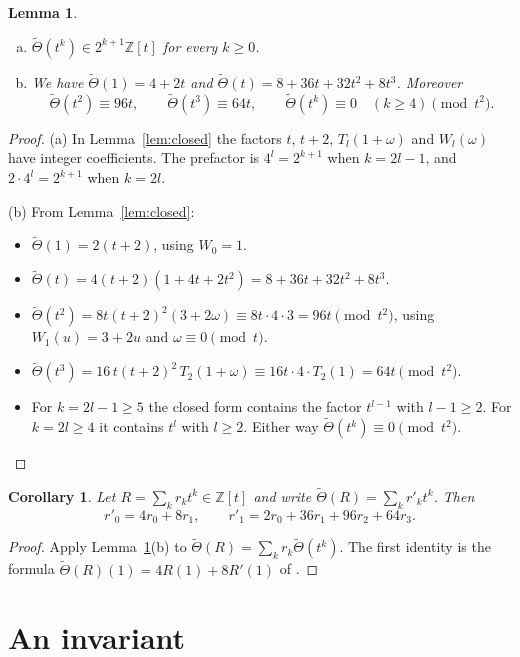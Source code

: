 \documentclass[11pt]{amsart}
\newtheorem{lemma}[theorem]{Lemma}
\newtheorem{corollary}[theorem]{Corollary}
\theoremstyle{definition}
\theoremstyle{remark}
\newcommand{\Z}{\mathbb{Z}}
\newcommand{\Th}{\widetilde{\Theta}}
\begin{document}
\begin{lemma}\label{lem:ab}
\begin{enumerate}[(a)]
\item $\Th(t^k)\in 2^{k+1}\Z[t]$ for every $k\ge0$.
\item We have $\Th(1)=4+2t$ and $\Th(t)=8+36t+32t^2+8t^3$. Moreover
\[
  \Th(t^2)\equiv 96t,\qquad \Th(t^3)\equiv 64t,\qquad \Th(t^k)\equiv0\quad(k\ge4)\pmod{t^2}.
\]
\end{enumerate}
\end{lemma}
\begin{proof}
(a) In Lemma~\ref{lem:closed} the factors $t$, $t+2$, $T_l(1+\omega)$ and $W_l(\omega)$ have integer coefficients. The prefactor is $4^l=2^{k+1}$ when $k=2l-1$, and $2\cdot 4^l=2^{k+1}$ when $k=2l$.

(b) From Lemma~\ref{lem:closed}:
\begin{itemize}
\item $\Th(1)=2(t+2)$, using $W_0=1$.
\item $\Th(t)=4(t+2)(1+4t+2t^2)=8+36t+32t^2+8t^3$.
\item $\Th(t^2)=8t(t+2)^2(3+2\omega)\equiv 8t\cdot4\cdot3=96t \pmod{t^2}$, using $W_1(u)=3+2u$ and $\omega\equiv0\pmod t$.
\item $\Th(t^3)=16\,t(t+2)^2\,T_2(1+\omega)\equiv 16t\cdot 4\cdot T_2(1)=64t \pmod{t^2}$.
\item For $k=2l-1\ge5$ the closed form contains the factor $t^{l-1}$ with $l-1\ge2$. For $k=2l\ge4$ it contains $t^l$ with $l\ge2$. Either way $\Th(t^k)\equiv0\pmod{t^2}$.\qedhere
\end{itemize}
\end{proof}

\begin{corollary}\label{cor:rec}
Let $R=\sum_k r_kt^k\in\Z[t]$ and write $\Th(R)=\sum_kr'_kt^k$. Then
\[
  r'_0=4r_0+8r_1,\qquad r'_1=2r_0+36r_1+96r_2+64r_3 .
\]
\end{corollary}
\begin{proof}
Apply Lemma~\ref{lem:ab}(b) to $\Th(R)=\sum_kr_k\Th(t^k)$. The first identity is the formula $\Th(R)(1)=4R(1)+8R'(1)$ of \cite[Lemma~6.1]{ST}.
\end{proof}

\section{An invariant}\label{sec:inv}
\end{document}
